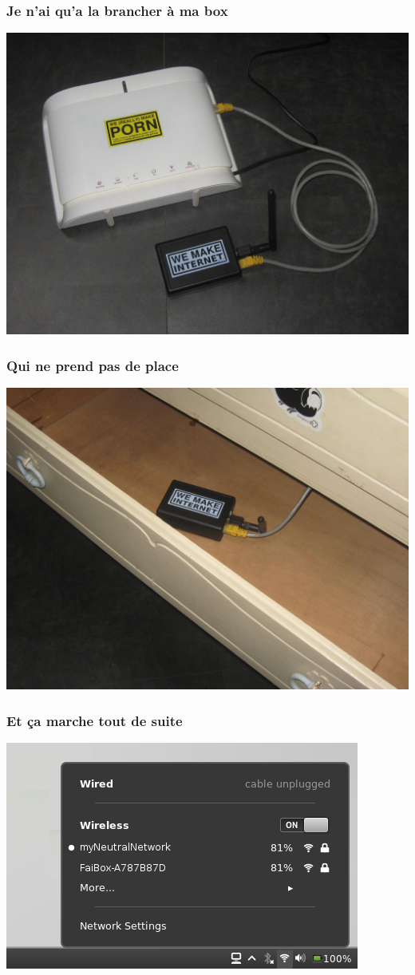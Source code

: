 \documentclass[notes=hide]{beamer}
\begin{document}
\begin{frame}[t]
\frametitle{\textcolor{titre}{Je n'ai qu'a la brancher à ma box}}
\begin{center}
\vfill
\includegraphics[width=.75\textwidth]{img2/05-photo-neufboxboitier.jpg}
\vfill
\end{center}
\end{frame}

\begin{frame}[t]
\frametitle{\textcolor{titre}{Qui ne prend pas de place}}
\begin{center}
\vfill
\includegraphics[width=.75\textwidth]{img2/16-photo-boitiercommode.jpg}
\vfill
\end{center}
\end{frame}

\begin{frame}[t]
\frametitle{\textcolor{titre}{Et ça marche tout de suite}}
\begin{center}
\vfill
\includegraphics[width=.8\textwidth]{img2/06-capture-wifiboitier.png}
\vfill
\end{center}
\end{frame}
\end{document}
